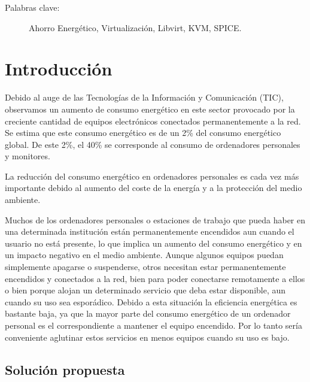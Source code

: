 \documentclass[spanisheDIVcalc,twoside,parskip-,pointlessnumbers,final]{scrbook}
\newcommand{\clearemptydoublepage}{\newpage{\pagestyle{empty}\cleardoublepage}}
\begin{document}
\begin{description}
\item [{Palabras clave:}] Ahorro Energético, Virtualización, Libvirt, KVM, SPICE.
\end{description}



\frontmatter

\tableofcontents{}
\clearemptydoublepage

\listoffigures

\mainmatter
\newpage{}

\clearemptydoublepage
\chapter{Introducción}

Debido al auge de las Tecnologías de la Información y Comunicación
(TIC), observamos un aumento de consumo energético en este sector
provocado por la creciente cantidad de equipos electrónicos conectados
permanentemente a la red. Se estima que este consumo energético es
de un 2\% del consumo energético global. De este 2\%, el 40\% se corresponde
al consumo de ordenadores personales y monitores.

La reducción del consumo energético en ordenadores personales es cada
vez más importante debido al aumento del coste de la energía y a la
protección del medio ambiente.

Muchos de los ordenadores personales o estaciones de trabajo que pueda
haber en una determinada institución están permanentemente encendidos
aun cuando el usuario no está presente, lo que implica un aumento
del consumo energético y en un impacto negativo en el medio ambiente.
Aunque algunos equipos puedan simplemente apagarse o suspenderse,
otros necesitan estar permanentemente encendidos y conectados a la
red, bien para poder conectarse remotamente a ellos o bien porque
alojan un determinado servicio que deba estar disponible, aun cuando
su uso sea esporádico. Debido a esta situación la eficiencia energética
es bastante baja, ya que la mayor parte del consumo energético de
un ordenador personal es el correspondiente a mantener el equipo encendido.
Por lo tanto sería conveniente aglutinar estos servicios en menos
equipos cuando su uso es bajo.


\section{Solución propuesta}
\end{document}

